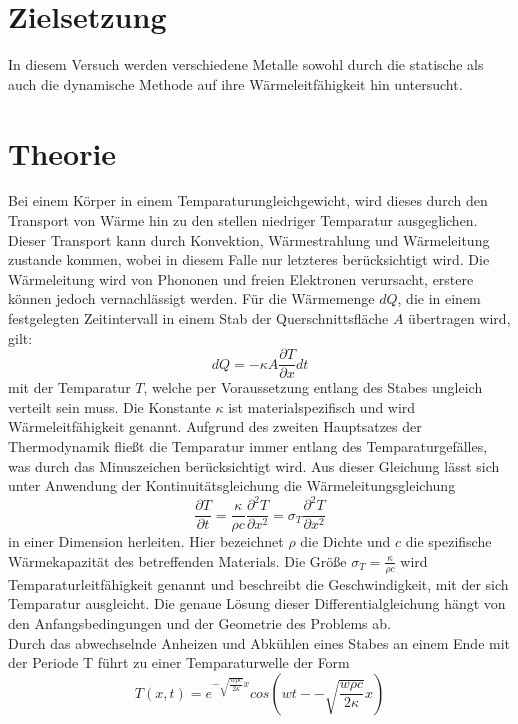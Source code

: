 \section{Zielsetzung}
In diesem Versuch werden verschiedene Metalle sowohl durch die statische als auch die dynamische Methode auf ihre Wärmeleitfähigkeit hin untersucht.
\section{Theorie}
Bei einem Körper in einem Temparaturungleichgewicht, wird dieses durch den Transport von Wärme hin zu den stellen niedriger Temparatur ausgeglichen. Dieser Transport kann durch Konvektion, Wärmestrahlung und Wärmeleitung zustande kommen, wobei in diesem Falle nur letzteres berücksichtigt wird. Die Wärmeleitung wird von Phononen und freien Elektronen verursacht, erstere können jedoch vernachlässigt werden. Für die Wärmemenge $dQ$, die in einem festgelegten Zeitintervall in einem Stab der Querschnittsfläche $A$ übertragen wird, gilt:
\begin{equation}
dQ=-\kappa A \frac{\partial T}{\partial x}dt
\end{equation}
mit der Temparatur $T$, welche per Voraussetzung entlang des Stabes ungleich verteilt sein muss. Die Konstante $\kappa$ ist materialspezifisch und wird Wärmeleitfähigkeit genannt. Aufgrund des zweiten Hauptsatzes der Thermodynamik fließt die Temparatur immer entlang des Temparaturgefälles, was durch das Minuszeichen berücksichtigt wird. Aus dieser Gleichung lässt sich unter Anwendung der Kontinuitätsgleichung die Wärmeleitungsgleichung 
\begin{equation}
\frac{\partial T}{\partial t}=\frac{\kappa}{\rho c} \frac{\partial^2 T}{\partial x^2}=\sigma_T \frac{\partial^2 T}{\partial x^2} 
\end{equation}
in einer Dimension herleiten. Hier bezeichnet $\rho$ die Dichte und $c$ die spezifische Wärmekapazität des betreffenden Materials. Die Größe $\sigma_T=\frac{\kappa}{\rho c}$ wird Temparaturleitfähigkeit genannt und beschreibt die Geschwindigkeit, mit der sich Temparatur ausgleicht. Die genaue Lösung dieser Differentialgleichung hängt von den Anfangsbedingungen und der Geometrie des Problems ab. \\
Durch das abwechselnde Anheizen und Abkühlen eines Stabes an einem Ende mit der Periode T führt zu einer Temparaturwelle der Form
\begin{equation}
T(x,t)=e^{-\sqrt{\frac{w\rho c}{2\kappa}}x}cos(wt--\sqrt{\frac{w\rho c}{2\kappa}}x)
\end{equation}
